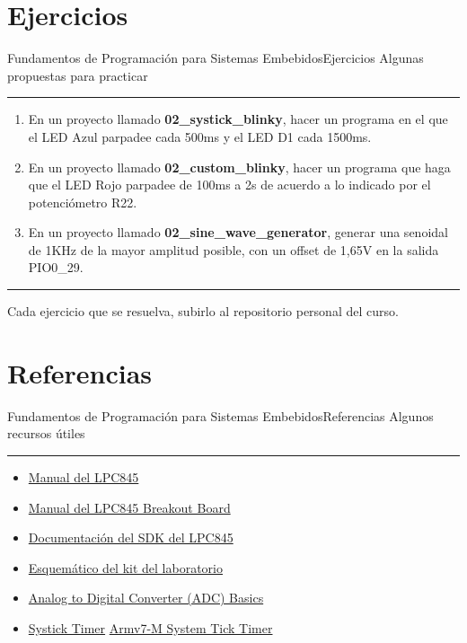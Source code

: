 \documentclass[aspectratio=169, xcolor=dvipsnames]{beamer}
\begin{document}
\section{Ejercicios}
\begin{frame}{Fundamentos de Programación para Sistemas Embebidos}{Ejercicios}
    Algunas propuestas para practicar
    \noindent\rule{\textwidth}{0.75pt}
    \begin{enumerate}
        \item En un proyecto llamado \textbf{02\_systick\_blinky}, hacer un programa en el que el LED Azul parpadee cada 500ms y el LED D1 cada 1500ms.
        \item En un proyecto llamado \textbf{02\_custom\_blinky}, hacer un programa que haga que el LED Rojo parpadee de 100ms a 2s de acuerdo a lo indicado por el potenciómetro R22.
        \item En un proyecto llamado \textbf{02\_sine\_wave\_generator}, generar una senoidal de 1KHz de la mayor amplitud posible, con un offset de 1,65V en la salida PIO0\_29.
    \end{enumerate}
    \noindent\rule{\textwidth}{0.75pt}
    Cada ejercicio que se resuelva, subirlo al repositorio personal del curso.
\end{frame}

\section{Referencias}
\begin{frame}{Fundamentos de Programación para Sistemas Embebidos}{Referencias}
    Algunos recursos útiles
    \noindent\rule{\textwidth}{0.75pt}
    \begin{multicols}{2}
    \begin{itemize}
        \item \href{https://github.com/utn-fra-lse/lpc845/blob/main/docs/UM11029.pdf}{Manual del LPC845}
        \item \href{https://github.com/utn-fra-lse/lpc845/blob/main/docs/UM11181.pdf}{Manual del LPC845 Breakout Board}
        \item \href{https://mcuxpresso.nxp.com/api_doc/dev/116/modules.html}{Documentación del SDK del LPC845}
        \item \href{https://github.com/utn-fra-lse/lpc845/blob/main/docs/BASE_KIT_V0.pdf}{Esquemático del kit del laboratorio}
        \item \href{https://www.electronics-tutorials.ws/combination/analogue-to-digital-converter.html}{Analog to Digital Converter (ADC) Basics}
        \item \href{https://www.keil.com/pack/doc/CMSIS_Dev/Core/html/group__SysTick__gr.html}{Systick Timer}
        \href{https://developer.arm.com/documentation/101407/0540/Debugging/Debug-Windows-and-Dialogs/Core-Peripherals/Armv7-M-cores/Armv7-M--System-Tick-Timer}{Armv7-M System Tick Timer}
    \end{itemize}
    \end{multicols}
\end{frame}
\end{document}
